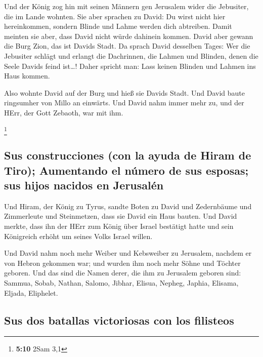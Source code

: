  Und der König zog hin mit seinen Männern gen Jerusalem
wider die Jebusiter, die im Lande wohnten. Sie aber sprachen zu David:
Du wirst nicht hier hereinkommen, sondern Blinde und Lahme werden dich
abtreiben. Damit meinten sie aber, dass David nicht würde dahinein
kommen.  David aber gewann die Burg Zion, das ist Davids
Stadt.  Da sprach David desselben Tages: Wer die Jebusiter
schlägt und erlangt die Dachrinnen, die Lahmen und Blinden, denen die
Seele Davids feind ist\ldots! Daher spricht man: Lass keinen Blinden und
Lahmen ins Haus kommen.

 Also wohnte David auf der Burg und hieß sie Davids Stadt.
Und David baute ringsumher von Millo an einwärts.  Und
David nahm immer mehr zu, und der HErr, der Gott Zebaoth, war mit ihm.

\footnote{\textbf{5:10} 2Sam 3,1}

\hypertarget{sus-construcciones-con-la-ayuda-de-hiram-de-tiro-aumentando-el-nuxfamero-de-sus-esposas-sus-hijos-nacidos-en-jerusaluxe9n}{%
\subsection{Sus construcciones (con la ayuda de Hiram de Tiro);
Aumentando el número de sus esposas; sus hijos nacidos en
Jerusalén}\label{sus-construcciones-con-la-ayuda-de-hiram-de-tiro-aumentando-el-nuxfamero-de-sus-esposas-sus-hijos-nacidos-en-jerusaluxe9n}}

 Und Hiram, der König zu Tyrus, sandte Boten zu David und
Zedernbäume und Zimmerleute und Steinmetzen, dass sie David ein Haus
bauten.  Und David merkte, dass ihn der HErr zum König
über Israel bestätigt hatte und sein Königreich erhöht um seines Volks
Israel willen.

 Und David nahm noch mehr Weiber und Kebsweiber zu
Jerusalem, nachdem er von Hebron gekommen war; und wurden ihm noch mehr
Söhne und Töchter geboren.  Und das sind die Namen derer,
die ihm zu Jerusalem geboren sind: Sammua, Sobab, Nathan, Salomo,
 Jibhar, Elisua, Nepheg, Japhia,  Elisama,
Eljada, Eliphelet.

\hypertarget{sus-dos-batallas-victoriosas-con-los-filisteos}{%
\subsection{Sus dos batallas victoriosas con los
filisteos}\label{sus-dos-batallas-victoriosas-con-los-filisteos}}

